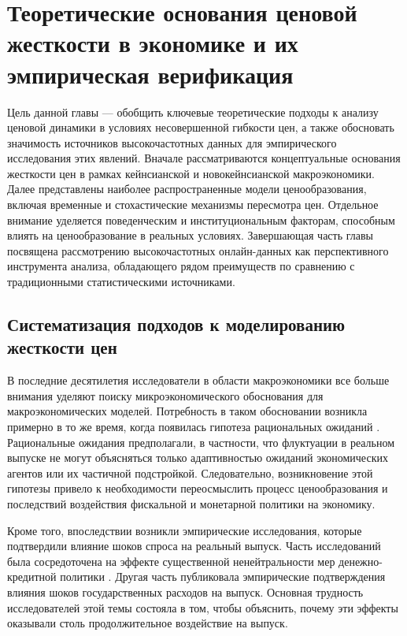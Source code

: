 \chapter{Теоретические основания ценовой жесткости в экономике и их эмпирическая верификация}\label{ch:ch1}

Цель данной главы — обобщить ключевые теоретические подходы к анализу ценовой динамики в условиях несовершенной гибкости цен, а также обосновать значимость источников высокочастотных данных для эмпирического исследования этих явлений. Вначале рассматриваются концептуальные основания жесткости цен в рамках кейнсианской и новокейнсианской макроэкономики. Далее представлены наиболее распространенные модели ценообразования, включая временные и стохастические механизмы пересмотра цен. Отдельное внимание уделяется поведенческим и институциональным факторам, способным влиять на ценообразование в реальных условиях. Завершающая часть главы посвящена рассмотрению высокочастотных онлайн-данных как перспективного инструмента анализа, обладающего рядом преимуществ по сравнению с традиционными статистическими источниками.

\section{Систематизация подходов к моделированию жесткости цен}\label{sec:ch1/sec1}

В последние десятилетия исследователи в области макроэкономики все больше внимания уделяют поиску микроэкономического обоснования для макроэкономических моделей. Потребность в таком обосновании возникла примерно в то же время, когда появилась гипотеза рациональных ожиданий \cite{lucas1972expectations}. Рациональные ожидания предполагали, в частности, что флуктуации в реальном выпуске не могут объясняться только адаптивностью ожиданий экономических агентов или их частичной подстройкой. Следовательно, возникновение этой гипотезы привело к необходимости переосмыслить процесс ценообразования и последствий воздействия фискальной и монетарной политики на экономику.


Кроме того, впоследствии возникли эмпирические исследования, которые подтвердили влияние шоков спроса на реальный выпуск. Часть исследований была сосредоточена на эффекте существенной ненейтральности мер денежно-кредитной политики \cite{friedman1963, christiano1999, romer2004}. Другая часть публиковала эмпирические подтверждения влияния шоков государственных расходов на выпуск. Основная трудность исследователей этой темы состояла в том, чтобы объяснить, почему эти эффекты оказывали столь продолжительное воздействие на выпуск.


